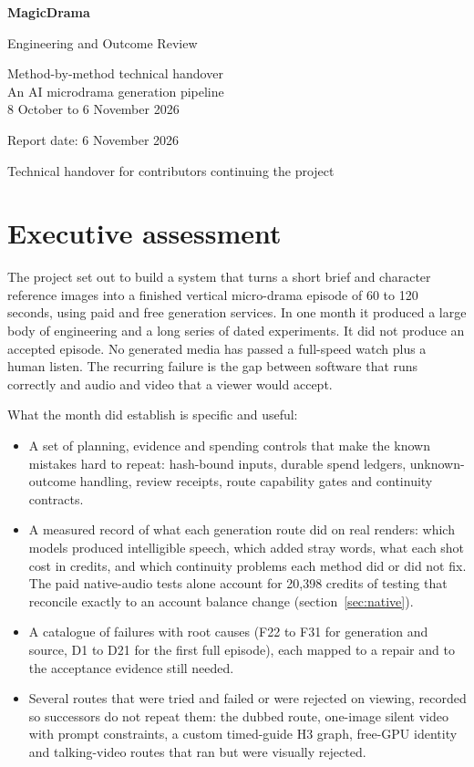 \documentclass[11pt,a4paper]{article}
\begin{document}
\begin{titlepage}
\centering\vspace*{4cm}
{\Huge\bfseries\color{accent} MagicDrama\par}
\vspace{0.6cm}
{\LARGE Engineering and Outcome Review\par}
\vspace{0.4cm}
{\large Method-by-method technical handover\\An AI microdrama generation pipeline\\8 October to 6 November 2026\par}
\vfill
{\large Report date: 6 November 2026\par}
\vspace{0.3cm}
{\small Technical handover for contributors continuing the project\par}
\vspace{2cm}
\end{titlepage}
\setcounter{tocdepth}{2}
\tableofcontents
\newpage
\section{Executive assessment}
The project set out to build a system that turns a short brief and character reference images into a finished vertical micro-drama episode of 60 to 120 seconds, using paid and free generation services. In one month it produced a large body of engineering and a long series of dated experiments. It did not produce an accepted episode. No generated media has passed a full-speed watch plus a human listen. The recurring failure is the gap between software that runs correctly and audio and video that a viewer would accept.

What the month did establish is specific and useful:
\begin{itemize}
\item A set of planning, evidence and spending controls that make the known mistakes hard to repeat: hash-bound inputs, durable spend ledgers, unknown-outcome handling, review receipts, route capability gates and continuity contracts.
\item A measured record of what each generation route did on real renders: which models produced intelligible speech, which added stray words, what each shot cost in credits, and which continuity problems each method did or did not fix. The paid native-audio tests alone account for 20,398 credits of testing that reconcile exactly to an account balance change (section~\ref{sec:native}).
\item A catalogue of failures with root causes (F22 to F31 for generation and source, D1 to D21 for the first full episode), each mapped to a repair and to the acceptance evidence still needed.
\item Several routes that were tried and failed or were rejected on viewing, recorded so successors do not repeat them: the dubbed route, one-image silent video with prompt constraints, a custom timed-guide H3 graph, free-GPU identity and talking-video routes that ran but were visually rejected.
\end{itemize}
\end{document}
